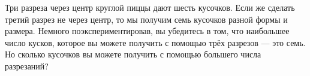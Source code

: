 
Три разреза через центр круглой пиццы дают шесть кусочков. Если же сделать третий разрез не через центр, то мы получим семь кусочков разной формы и размера. Немного поэкспериментировав, вы убедитесь в том, что наибольшее число кусков, которое вы можете получить с помощью трёх разрезов --- это семь. Но сколько кусочков вы можете получить с помощью большего числа разрезаний?

\begin{center}  \end{center}

